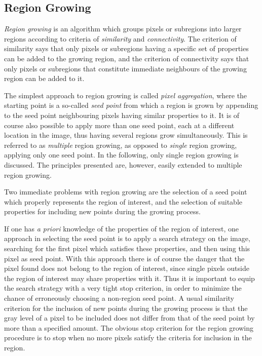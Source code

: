 \subsection{Region Growing}
\label{image:segment:region}

{\em Region growing\/} is an algorithm which groups pixels or
subregions into larger regions according to criteria of {\em
  similarity\/} and {\em connectivity\/}.  The criterion of similarity
says that only pixels or subregions having a specific set of
properties can be added to the growing region, and the criterion of
connectivity says that only pixels or subregions that constitute
immediate neighbours of the growing region can be added to it.

The simplest approach to region growing is called {\em pixel
  aggregation\/}, where the starting point is a so-called {\em seed
  point\/} from which a region is grown by appending to the seed point
neighbouring pixels having similar properties to it.  It is of course
also possible to apply more than one seed point, each at a different
location in the image, thus having several regions grow
simultaneously.  This is referred to as {\em multiple\/} region
growing, as opposed to {\em single\/} region growing, applying only
one seed point.  In the following, only single region growing is
discussed.  The principles presented are, however, easily extended to
multiple region growing.

Two immediate problems with region growing are the selection of a seed
point which properly represents the region of interest, and the
selection of suitable properties for including new points during the
growing process.  

If one has {\em a priori\/} knowledge of the properties of the region
of interest, one approach in selecting the seed point is to apply a
search strategy on the image, searching for the first pixel which
satisfies these properties, and then using this pixel as seed point.
With this approach there is of course the danger that the pixel found
does not belong to the region of interest, since single pixels outside
the region of interest may share properties with it.  Thus it is
important to equip the search strategy with a very tight stop
criterion, in order to minimize the chance of erroneously choosing a
non-region seed point.  A usual similarity criterion for the inclusion
of new points during the growing process is that the gray level of a
pixel to be included does not differ from that of the seed point by
more than a specified amount.  The obvious stop criterion for the
region growing procedure is to stop when no more pixels satisfy the
criteria for inclusion in the region.

